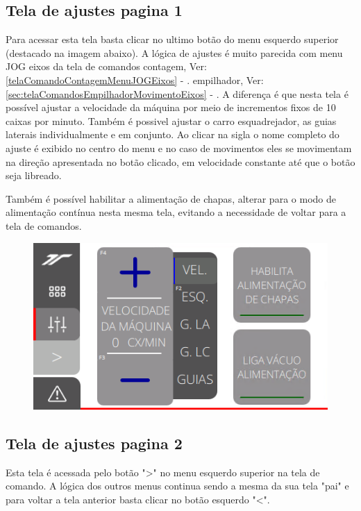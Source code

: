\newpage
\thispagestyle{fancy}
\vspace*{40 pt}
\subsection{Tela de ajustes pagina 1}\label{ihmAlimentacaoTelaAjustesPagina1}

Para acessar esta tela basta clicar no ultimo botão do menu esquerdo superior (destacado na imagem abaixo). 
A lógica de ajustes é muito parecida com menu JOG eixos da tela de comandos 
\ifmachineType
contagem, Ver: \ref{telaComandoContagemMenuJOGEixos} - .
\else
empilhador, Ver: \ref{sec:telaComandosEmpilhadorMovimentoEixos} - .
\fi
A diferença é que nesta tela é possível ajustar a velocidade da máquina por meio
de incrementos fixos de 10 caixas por minuto. Também é possivel ajustar o carro esquadrejador, as guias laterais individualmente e em conjunto.
Ao clicar na sigla o nome completo do ajuste é exibido no centro do menu e no caso de movimentos eles se movimentam na direção apresentada no botão clicado,
em velocidade constante até que o botão seja libreado.

Também é possível habilitar a alimentação de chapas, alterar para o modo de alimentação contínua nesta mesma tela, evitando a necessidade de voltar para a tela de comandos.

\vspace*{\fill}
\begin{figure}[h]
  \centering
  \includegraphics{src/imagesFlexo/11-IHMALM/e-4.png}
\end{figure}
\vspace*{\fill}

\newpage
\thispagestyle{fancy}
\vspace*{40 pt}
\subsection{Tela de ajustes pagina 2}\label{telaAjustes2}
Esta tela é acessada pelo botão "\textgreater" no menu esquerdo superior na tela de comando. A lógica dos outros menus continua sendo a mesma da sua tela "pai" e para voltar a tela anterior basta clicar no botão esquerdo "\textless{}".

